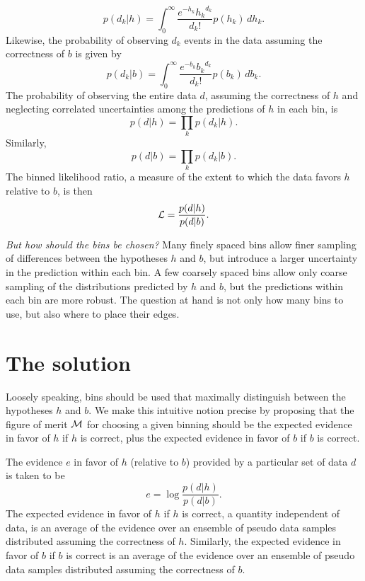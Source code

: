 \documentclass[twocolumn,twoside,prd]{revtex4} %
\begin{document}
\begin{equation}
p(d_k|h) = \int_0^\infty{ \frac{ e^{-h_k} {h_k}^{d_k} }{ d_k! } p(h_k) \, dh_k }.
\end{equation}
Likewise, the probability of observing $d_k$ events in the data assuming the correctness of $b$ is given by
\begin{equation}
p(d_k|b) = \int_0^\infty{ \frac{ e^{-b_k} {b_k}^{d_k} }{ d_k! } p(b_k) \, db_k }.
\end{equation}
The probability of observing the entire data $d$, assuming the correctness of $h$ and neglecting correlated uncertainties among the predictions of $h$ in each bin, is
\begin{equation}
p(d|h) = \prod_k { p(d_k|h) }.
\end{equation}
Similarly,
\begin{equation}
p(d|b) = \prod_k { p(d_k|b) }.
\end{equation}
The binned likelihood ratio, a measure of the extent to which the data favors $h$ relative to $b$, is then
\begin{equation}
{\cal L} = \frac{ p(d|h) }{ p(d|b) }.
\end{equation}

{\em But how should the bins be chosen?}  Many finely spaced bins allow finer sampling of differences between the hypotheses $h$ and $b$, but introduce a larger uncertainty in the prediction within each bin.  A few coarsely spaced bins allow only coarse sampling of the distributions predicted by $h$ and $b$, but the predictions within each bin are more robust.  The question at hand is not only how many bins to use, but also where to place their edges.

\section{The solution}

Loosely speaking, bins should be used that maximally distinguish between the hypotheses $h$ and $b$.  We make this intuitive notion precise by proposing that the figure of merit ${\cal M}$ for choosing a given binning should be the expected evidence in favor of $h$ if $h$ is correct, plus the expected evidence in favor of $b$ if $b$ is correct.

The evidence $e$ in favor of $h$ (relative to $b$) provided by a particular set of data $d$ is taken to be~\cite{Jaynes}
\begin{equation}
e = \log{ \frac{ p(d|h) }{ p(d|b) } }.
\end{equation}
  The expected evidence in favor of $h$ if $h$ is correct, a quantity independent of data, is an average of the evidence over an ensemble of pseudo data samples distributed assuming the correctness of $h$.  Similarly, the expected evidence in favor of $b$ if $b$ is correct is an average of the evidence over an ensemble of pseudo data samples distributed assuming the correctness of $b$.
\end{document}
